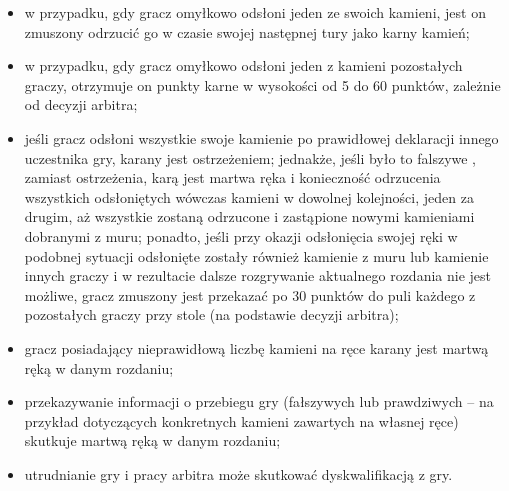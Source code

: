 \begin{itemize}
  \item w przypadku, gdy gracz omyłkowo odsłoni jeden ze swoich kamieni, jest on
  zmuszony odrzucić go w czasie swojej następnej tury jako karny kamień;
  \item w przypadku, gdy gracz omyłkowo odsłoni jeden z kamieni pozostałych
  graczy, otrzymuje on punkty karne w wysokości od 5 do 60 punktów, zależnie od
  decyzji arbitra;
  \item jeśli gracz odsłoni wszystkie swoje kamienie po prawidłowej deklaracji
   innego uczestnika gry, karany jest ostrzeżeniem; jednakże, jeśli
  było to falszywe , zamiast ostrzeżenia, karą jest martwa ręka i
  konieczność odrzucenia wszystkich odsłoniętych wówczas kamieni w dowolnej
  kolejności, jeden za drugim, aż wszystkie zostaną odrzucone i zastąpione
  nowymi kamieniami dobranymi z muru; ponadto, jeśli przy okazji odsłonięcia
  swojej ręki w podobnej sytuacji odsłonięte zostały również kamienie z muru lub
  kamienie innych graczy i w rezultacie dalsze rozgrywanie aktualnego rozdania
  nie jest możliwe, gracz zmuszony jest przekazać po 30 punktów do puli każdego
  z pozostałych graczy przy stole (na podstawie decyzji arbitra);
  \item gracz posiadający nieprawidłową liczbę kamieni na ręce karany jest
  martwą ręką w danym rozdaniu;
  \item przekazywanie informacji o przebiegu gry (fałszywych lub prawdziwych --
  na przykład dotyczących konkretnych kamieni zawartych na własnej ręce)
  skutkuje martwą ręką w danym rozdaniu;
  \item utrudnianie gry i pracy arbitra może skutkować dyskwalifikacją z gry.
\end{itemize}


